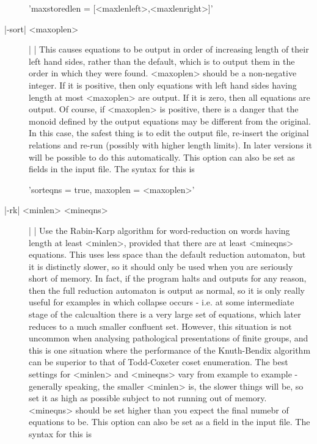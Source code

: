 \begin{description}
'maxstoredlen \:= [<maxlenleft>,<maxlenright>]'
\item[|-sort| <maxoplen>] | |\newline
This causes equations to be output in order of increasing length of their
left hand sides, rather than the default, which is to output them in the
order in which they were found. <maxoplen> should be a non-negative integer.
If it is positive, then only equations with left hand sides having length
at most <maxoplen> are output. If it is zero, then all equations are output.
Of course, if <maxoplen> is positive, there is a danger that the monoid
defined by the output equations may be different from the original.
In this case, the safest thing is to edit the output file,
re-insert the original relations and re-run (possibly with higher length
limits). In later versions it will be possible to do this automatically.
This option can also be set as fields in the input file.
The syntax for this is

'sorteqns \:= true, maxoplen \:= <maxoplen>'
\item[|-rk| <minlen> <mineqns>] | |\newline
Use the Rabin-Karp algorithm for word-reduction on words having length at least
<minlen>, provided that there are at least <mineqns> equations.
This uses less space than the default reduction automaton, but it is
distinctly slower, so it should only be used when you are seriously short of
memory.
In fact, if the program halts and outputs for any reason, then
the full reduction automaton is output as normal, so it is only really
useful for examples in which collapse occurs - i.e. at some intermediate
stage of the calcualtion there is a very large set of equations, which later
reduces to a much smaller confluent set. However, this situation is not
uncommon when analysing pathological presentations of finite groups, and
this is one situation where the performance of the Knuth-Bendix algorithm can
be superior to that of Todd-Coxeter coset enumeration.
The best settings for <minlen> and <mineqns> vary from example to
example - generally speaking, the smaller <minlen> is, the slower things
will be, so set it as high as possible subject to not running out of memory.
<mineqns> should be set higher than you expect the final numebr of
equations to be.
This option can also be set as a field in the input file.
The syntax for this is


\end{description}
